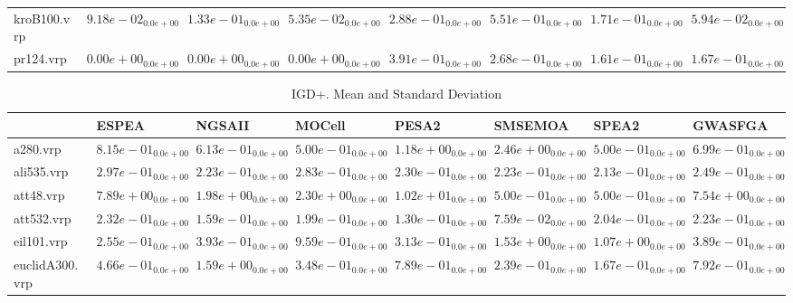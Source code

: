\documentclass{article}
\begin{document}
\begin{table}
\begin{scriptsize}
\begin{tabular}{llllllll}
kroB100.vrp & $  9.18e-02_{ 0.0e+00}$ & $  1.33e-01_{ 0.0e+00}$ & $  5.35e-02_{ 0.0e+00}$ & \cellcolor{gray25}$  2.88e-01_{ 0.0e+00}$ & \cellcolor{gray95}$  5.51e-01_{ 0.0e+00}$ & $  1.71e-01_{ 0.0e+00}$ & $  5.94e-02_{ 0.0e+00}$ \\
pr124.vrp & $  0.00e+00_{ 0.0e+00}$ & $  0.00e+00_{ 0.0e+00}$ & $  0.00e+00_{ 0.0e+00}$ & \cellcolor{gray95}$  3.91e-01_{ 0.0e+00}$ & \cellcolor{gray25}$  2.68e-01_{ 0.0e+00}$ & $  1.61e-01_{ 0.0e+00}$ & $  1.67e-01_{ 0.0e+00}$ \\
\hline
\end{tabular}
\end{scriptsize}
\end{table}

\begin{table}
\caption{IGD+. Mean and Standard Deviation}
\label{table: IGD+}
\centering
\begin{scriptsize}
\begin{tabular}{llllllll}
\hline & ESPEA & NGSAII & MOCell & PESA2 & SMSEMOA & SPEA2 &  GWASFGA\\
\hline 
a280.vrp & $  8.15e-01_{ 0.0e+00}$ & $  6.13e-01_{ 0.0e+00}$ & \cellcolor{gray95}$  5.00e-01_{ 0.0e+00}$ & $  1.18e+00_{ 0.0e+00}$ & $  2.46e+00_{ 0.0e+00}$ & \cellcolor{gray25}$  5.00e-01_{ 0.0e+00}$ & $  6.99e-01_{ 0.0e+00}$ \\
ali535.vrp & $  2.97e-01_{ 0.0e+00}$ & $  2.23e-01_{ 0.0e+00}$ & $  2.83e-01_{ 0.0e+00}$ & $  2.30e-01_{ 0.0e+00}$ & \cellcolor{gray25}$  2.23e-01_{ 0.0e+00}$ & \cellcolor{gray95}$  2.13e-01_{ 0.0e+00}$ & $  2.49e-01_{ 0.0e+00}$ \\
att48.vrp & $  7.89e+00_{ 0.0e+00}$ & $  1.98e+00_{ 0.0e+00}$ & $  2.30e+00_{ 0.0e+00}$ & $  1.02e+01_{ 0.0e+00}$ & \cellcolor{gray95}$  5.00e-01_{ 0.0e+00}$ & \cellcolor{gray25}$  5.00e-01_{ 0.0e+00}$ & $  7.54e+00_{ 0.0e+00}$ \\
att532.vrp & $  2.32e-01_{ 0.0e+00}$ & $  1.59e-01_{ 0.0e+00}$ & $  1.99e-01_{ 0.0e+00}$ & \cellcolor{gray25}$  1.30e-01_{ 0.0e+00}$ & \cellcolor{gray95}$  7.59e-02_{ 0.0e+00}$ & $  2.04e-01_{ 0.0e+00}$ & $  2.23e-01_{ 0.0e+00}$ \\
eil101.vrp & \cellcolor{gray95}$  2.55e-01_{ 0.0e+00}$ & $  3.93e-01_{ 0.0e+00}$ & $  9.59e-01_{ 0.0e+00}$ & \cellcolor{gray25}$  3.13e-01_{ 0.0e+00}$ & $  1.53e+00_{ 0.0e+00}$ & $  1.07e+00_{ 0.0e+00}$ & $  3.89e-01_{ 0.0e+00}$ \\
euclidA300.vrp & $  4.66e-01_{ 0.0e+00}$ & $  1.59e+00_{ 0.0e+00}$ & $  3.48e-01_{ 0.0e+00}$ & $  7.89e-01_{ 0.0e+00}$ & \cellcolor{gray25}$  2.39e-01_{ 0.0e+00}$ & \cellcolor{gray95}$  1.67e-01_{ 0.0e+00}$ & $  7.92e-01_{ 0.0e+00}$ \\

\end{tabular}
\end{scriptsize}
\end{table}
\end{document}
